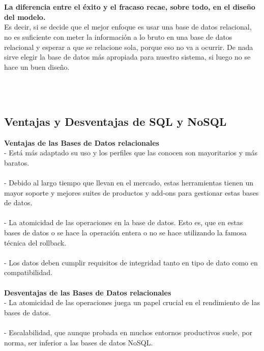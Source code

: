 \documentclass[twoside,twocolumn]{article}
\begin{document}
\begin{flushright}
\begin{itemize}
\textbf{}\\
\textbf{}\\
\textbf{La diferencia entre el éxito y el fracaso recae, sobre todo, en el diseño del modelo.}\\  Es decir, si se decide que el mejor enfoque es usar una base de datos relacional, no es suficiente con meter la información a lo bruto en una base de datos relacional y esperar a que se relacione sola, porque eso no va a ocurrir. De nada sirve elegir la base de datos más apropiada para nuestro sistema, si luego no se hace un buen diseño.

\textbf{}\\
\textbf{}\\







\subsection{Ventajas y Desventajas de SQL y NoSQL}
\textbf{Ventajas de las Bases de Datos relacionales}\\

-	Está más adaptado su uso y los perfiles que las conocen son mayoritarios y más baratos.\\
\textbf{}\\
-	Debido al largo tiempo que llevan en el mercado, estas herramientas tienen un mayor soporte y mejores suites de productos y add-ons para gestionar estas bases de datos.\\
\textbf{}\\
-	La atomicidad de las operaciones en la base de datos. Esto es, que en estas bases de datos o se hace la operación entera o no se hace utilizando la famosa técnica del rollback.\\
\textbf{}\\
-	Los datos deben cumplir requisitos de integridad tanto en tipo de dato como en compatibilidad.\\
\textbf{}\\

\textbf{Desventajas de las Bases de Datos relacionales}\\

-	La atomicidad de las operaciones juega un papel crucial en el rendimiento de las bases de datos.\\
\textbf{}\\
-	Escalabilidad, que aunque probada en muchos entornos productivos suele, por norma, ser inferior a las bases de datos NoSQL.\\


\end{itemize}
\end{flushright}
\end{document}
